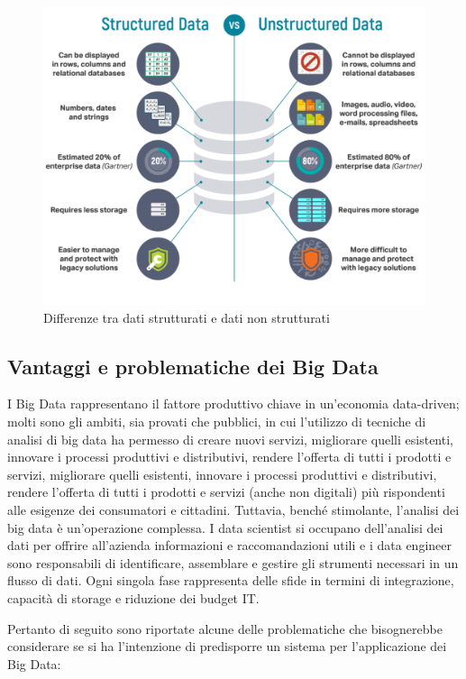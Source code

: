 \begin{figure}[h!]
    \centering
    \includegraphics[width=0.55\linewidth]{figure/capitolo_2/structured-data-vs-unstructured-data.pdf}
    \caption{Differenze tra dati strutturati e dati non strutturati}
    \label{fig:structured-data-vs-unstructured-data}
\end{figure}

\subsection{Vantaggi e problematiche dei Big Data}

I Big Data rappresentano il fattore produttivo chiave in un'economia data-driven; molti sono gli ambiti, sia provati che pubblici, in cui l'utilizzo di tecniche di analisi di big data ha permesso di creare nuovi servizi, migliorare quelli esistenti, innovare i processi produttivi e distributivi, rendere l'offerta di tutti i prodotti e servizi, migliorare quelli esistenti, innovare i processi produttivi e distributivi, rendere l'offerta di tutti i prodotti e servizi (anche non digitali) più rispondenti alle esigenze dei consumatori e cittadini. Tuttavia, benché stimolante, l'analisi dei big data è un'operazione complessa. I data scientist si occupano dell'analisi dei dati per offrire all'azienda informazioni e raccomandazioni utili e i data engineer sono responsabili di identificare, assemblare e gestire gli strumenti necessari in un flusso di dati. Ogni singola fase rappresenta delle sfide in termini di integrazione, capacità di storage e riduzione dei budget IT.\cite{redhat_big_data}

Pertanto di seguito sono riportate alcune delle problematiche che bisognerebbe considerare se si ha l'intenzione di predisporre un sistema per l'applicazione dei Big Data\cite{microsoft_big_data}:

